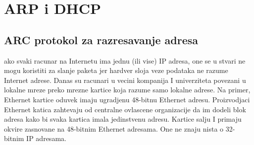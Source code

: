 \documentclass{article} %
\begin{document}
\section{ARP i DHCP}
\subsection{ARC protokol za razresavanje adresa}
ako svaki racunar na Internetu ima jednu (ili vise) IP adresa, one se u stvari ne mogu koristiti za slanje paketa jer hardver sloja veze podataka ne razume Internet adrese. Danas su racunari u vecini kompanija I univerziteta povezani u lokalne mreze preko mrezne kartice koja razume samo lokalne adrese. Na primer, Ethernet kartice oduvek imaju ugradjenu 48-bitnu Ethernet adresu. Proizvodjaci Ethernet katica zahtevaju od centralne ovlascene organizacije da im dodeli blok adresa kako bi svaka kartica imala jedinstvenu adresu. Kartice salju I primaju okvire zasnovane na 48-bitnim Ethernet adresama. One ne znaju nista o 32-bitnim IP adresama.\\
\end{document}
